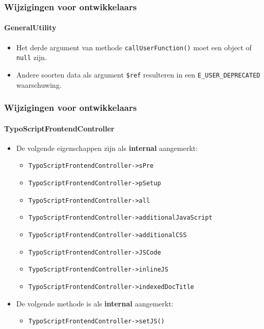\begin{frame}[fragile]
	\frametitle{Wijzigingen voor ontwikkelaars}
	\framesubtitle{GeneralUtility}

	\begin{itemize}
		\item Het derde argument van methode \texttt{callUserFunction()}
			moet een object of \texttt{null} zijn.
		\item Andere soorten data als argument \texttt{\$ref} resulteren in een
			\texttt{E\_USER\_DEPRECATED} waarschuwing.
	\end{itemize}

\end{frame}


\begin{frame}[fragile]
	\frametitle{Wijzigingen voor ontwikkelaars}
	\framesubtitle{TypoScriptFrontendController}

	\begin{itemize}
		\item De volgende eigenschappen zijn als \textbf{internal} aangemerkt:
			\begin{itemize}
				\item \texttt{TypoScriptFrontendController->sPre}
				\item \texttt{TypoScriptFrontendController->pSetup}
				\item \texttt{TypoScriptFrontendController->all}
				\item \texttt{TypoScriptFrontendController->additionalJavaScript}
				\item \texttt{TypoScriptFrontendController->additionalCSS}
				\item \texttt{TypoScriptFrontendController->JSCode}
				\item \texttt{TypoScriptFrontendController->inlineJS}
				\item \texttt{TypoScriptFrontendController->indexedDocTitle}
			\end{itemize}

		\item De volgende methode is als \textbf{internal} aangemerkt:

			\begin{itemize}
				\item \texttt{TypoScriptFrontendController->setJS()}
			\end{itemize}

	\end{itemize}

\end{frame}


